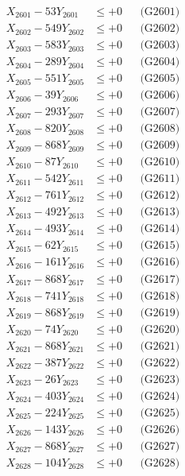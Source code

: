 \documentclass[a4paper,10pt]{article}
\begin{document}
{\begin{align}
\allowbreak
X_{2601} - 53Y_{2601} &\leq +0 && \text{(G2601)} \\
X_{2602} - 549Y_{2602} &\leq +0 && \text{(G2602)} \\
X_{2603} - 583Y_{2603} &\leq +0 && \text{(G2603)} \\
X_{2604} - 289Y_{2604} &\leq +0 && \text{(G2604)} \\
X_{2605} - 551Y_{2605} &\leq +0 && \text{(G2605)} \\
X_{2606} - 39Y_{2606} &\leq +0 && \text{(G2606)} \\
X_{2607} - 293Y_{2607} &\leq +0 && \text{(G2607)} \\
X_{2608} - 820Y_{2608} &\leq +0 && \text{(G2608)} \\
X_{2609} - 868Y_{2609} &\leq +0 && \text{(G2609)} \\
X_{2610} - 87Y_{2610} &\leq +0 && \text{(G2610)} \\
\allowbreak
X_{2611} - 542Y_{2611} &\leq +0 && \text{(G2611)} \\
X_{2612} - 761Y_{2612} &\leq +0 && \text{(G2612)} \\
X_{2613} - 492Y_{2613} &\leq +0 && \text{(G2613)} \\
X_{2614} - 493Y_{2614} &\leq +0 && \text{(G2614)} \\
X_{2615} - 62Y_{2615} &\leq +0 && \text{(G2615)} \\
X_{2616} - 161Y_{2616} &\leq +0 && \text{(G2616)} \\
X_{2617} - 868Y_{2617} &\leq +0 && \text{(G2617)} \\
X_{2618} - 741Y_{2618} &\leq +0 && \text{(G2618)} \\
X_{2619} - 868Y_{2619} &\leq +0 && \text{(G2619)} \\
X_{2620} - 74Y_{2620} &\leq +0 && \text{(G2620)} \\
\allowbreak
X_{2621} - 868Y_{2621} &\leq +0 && \text{(G2621)} \\
X_{2622} - 387Y_{2622} &\leq +0 && \text{(G2622)} \\
X_{2623} - 26Y_{2623} &\leq +0 && \text{(G2623)} \\
X_{2624} - 403Y_{2624} &\leq +0 && \text{(G2624)} \\
X_{2625} - 224Y_{2625} &\leq +0 && \text{(G2625)} \\
X_{2626} - 143Y_{2626} &\leq +0 && \text{(G2626)} \\
X_{2627} - 868Y_{2627} &\leq +0 && \text{(G2627)} \\
X_{2628} - 104Y_{2628} &\leq +0 && \text{(G2628)} \\

\end{align}}
\end{document}
